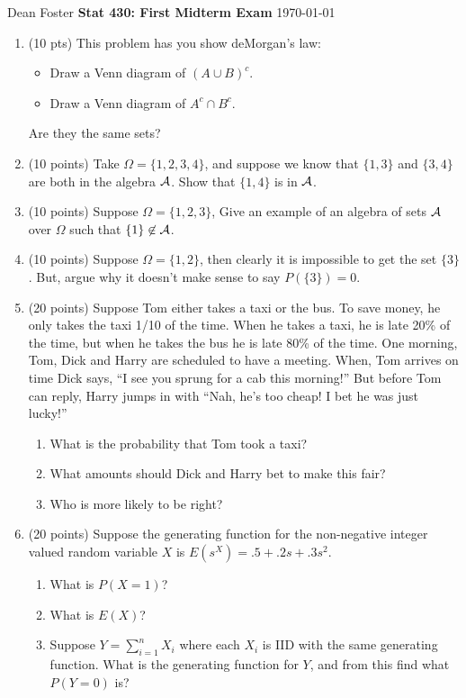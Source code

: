 \documentclass[14pt]{extarticle}
\begin{document}
Dean Foster \hfill {\bf Stat 430: First Midterm Exam} \hfill\today
\vspace{1em}

\begin{enumerate}
\item (10 pts) This problem has you show deMorgan's law:
\begin{itemize}
\item Draw a Venn diagram of $(A \cup B)^c$.
\item Draw a Venn diagram of $A^c \cap B^c$.
\end{itemize}
Are they the same sets?

\vfill

\item (10 points) Take $\Omega = \{1,2,3,4\}$, and suppose we know that $\{1,3\}$ and
$\{3,4\}$ are both in the algebra $\cal A$.  Show that $\{1,4\}$ is in $\cal A$.

\vfill

\item (10 points) Suppose $\Omega = \{1,2,3\}$, Give an example of an
algebra of sets $\cal A$ over $\Omega$ such that $\{1\} \not\in {\cal A}$.

\vfill

\item (10 points) Suppose $\Omega = \{1,2\}$, then clearly it is
impossible to get the set $\{3\}$.  But, argue why it doesn't make
sense to say $P(\{3\}) = 0$.

\vfill

\item (20 points) Suppose Tom either takes a taxi or the bus.  To save
money, he only takes the taxi 1/10 of the time.  When he takes a taxi,
he is late 20\% of the time, but when he takes the bus he is late 80\%
of the time.  One morning, Tom, Dick and Harry are scheduled to have a
meeting.  When, Tom arrives on time Dick says, ``I see you sprung for
a cab this morning!''  But before Tom can reply, Harry jumps in with
``Nah, he's too cheap!  I bet he was just lucky!''  
\begin{enumerate}
\item What is the probability that Tom took a taxi?
\item What amounts should Dick and Harry bet to make this fair?
\item Who is more likely to be right?
\end{enumerate}
\newpage
\item (20 points) Suppose the generating function for the non-negative
 integer valued random variable $X$ is $E(s^X) = .5 + .2s + .3 s^2$.
\begin{enumerate}
\item What is $P(X = 1)$?
\item What is $E(X)$?
\item Suppose $Y = \sum_{i=1}^n X_i$ where each $X_i$ is IID with the
same generating function.  What is the generating function for $Y$,
and from this find what $P(Y=0)$ is?
\end{enumerate}


\end{enumerate}
\end{document}
